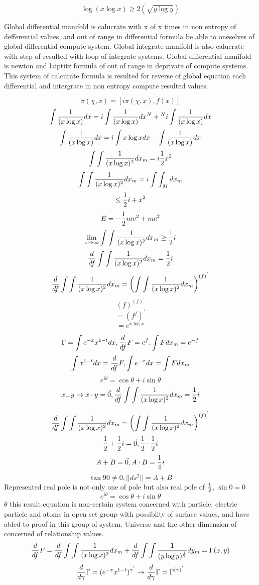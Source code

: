 \documentclass{jsarticle}
\begin{document}
  $$ \log (x \log x) \ge 2(\sqrt{y \log y}) $$

  Global differential manifold is calucrate with x of x times in non
  entropy of defferential values, and out of range in differential formula
  be able to oneselves of global differential compute system.
  Global integrate manifold is also calucrate with step of resulted with
  loop of integrate systems. Global differential manifold is newton and 
  laiptitz formula of out of range in deprivate of compute systems.
  This system of calcurate formula is resulted for reverse of global equation
  each differential and intergrate in non entropy compute resulted values.

  $$ \pi(\chi,x) = [i\pi(\chi,x),f(x)] $$
  $$ \int{1 \over (x \log x)}dx = i \int{1 \over (x \log x)}dx^{N}  
  + {}^{N} i \int{1 \over (x \log x)}dx $$
  $$  \int{1 \over (x \log x)}dx = i \int{x \log x}dx 
  - \int{1 \over (x \log x)}dx $$
  $$ \int \int{1 \over (x \log x)^2}dx_m = i {1 \over 2}x^2 $$
  $$ \int \int{1 \over (x \log x)^2}dx_m = i \int \int_M dx_m $$
  $$ \le {1 \over 2}i + x^2 $$
  $$ E = - {1 \over 2}mv^2 + mc^2 $$
  $$ \lim_{x \to \infty} \int \int{1 \over (x \log x)^2}dx_m \ge {1 \over 2}i $$
  $$ {d \over df}\int \int{1 \over (x \log x)^2}dx_m = {1 \over 2}i $$
  $$ {d \over df}\int \int{1 \over (x \log x)^2}dx_m = 
  \left(\int \int {1 \over (x \log x)^2}dx_m \right)^{(f)^{'}}$$
  $$ (f)^{(f)^{'}} $$
  $$ = (f^f)^{'} $$
  $$ = e^{x \log x} $$

  $$ \Gamma = \int {e^{-x}x^{1-t}}dx, 
  {d \over df}F = e^f, \int F dx_m = e^{-f} $$
  $$ \int x^{1-t}dx = {d \over df}F, \int e^{-x}dx = \int F dx_m $$
  $$ e^{i \theta} = \cos \theta + i \sin \theta $$
  $$ x \bot y \to x \cdot y = \vec{0}, 
  {d \over df}\int \int{1 \over (x \log x)^2}dx_m = {1 \over 2}i $$

  $$ {d \over df}\int \int{1 \over (x \log x)^2}dx_m = 
  \left(\int \int {1 \over (x \log x)^2}dx_m \right)^{(f)^{'}}$$
  $$ {1 \over 2} + {1 \over 2}i = \vec{0}, {1 \over 2}\cdot{1 \over 2}i $$
  $$ A + B  =  \vec{0}, A \cdot B = {1 \over 4}i $$
  $$  \tan 90 \neq 0, ||ds^2|| = A + B $$
  Represented real pole is not only one of pole but also real pole of 
  $ {1 \over 2} $, 
  $\sin 0 = 0$ $$ e^{i \theta} = \cos \theta + i \sin \theta $$
  $\theta $
  this result equation is non-certain system concerned with particle, electric 
  particle and atoms in open set group with possiblity of surface values,
  and have abled to proof in this group of system. Universe and the other
  dimension of concerned of relationship values.
  $$ {d \over df}F = {d \over df} \int \int{1 \over (x \log x)^2}dx_m 
  + {d \over df} \int \int {1 \over (y \log y)^{1 \over 2}}dy_m
  = \Gamma(x,y) $$
  $$ {d \over d \gamma}\Gamma = (e^{-x}x^{1-t})^{\gamma^{'}} \to
  {d \over d \gamma}\Gamma = \Gamma^{(\gamma)^{'}}$$
\end{document}

